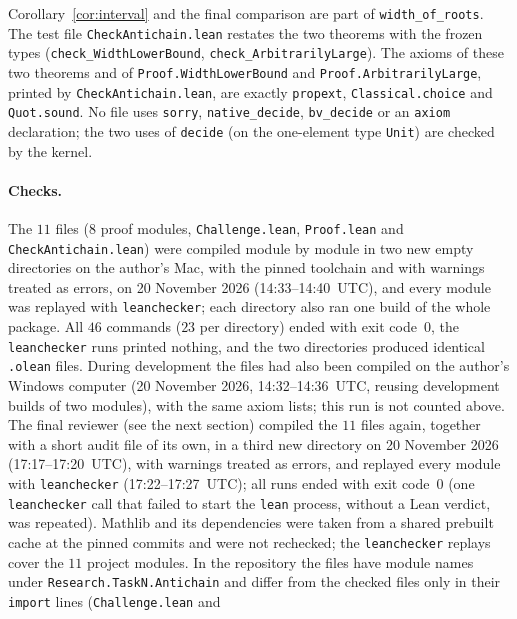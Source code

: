 \documentclass[11pt]{article}
\theoremstyle{definition}
\theoremstyle{remark}
\begin{document}
{\noindent Corollary~\ref{cor:interval} and the final comparison are part of
\texttt{width\_\allowbreak of\_\allowbreak roots}. The test file
\texttt{CheckAntichain.lean} restates the two theorems with the frozen types
(\texttt{check\_\allowbreak WidthLowerBound},
\texttt{check\_\allowbreak ArbitrarilyLarge}). The axioms of these two theorems
and of \texttt{Proof.WidthLowerBound} and \texttt{Proof.ArbitrarilyLarge},
printed by \texttt{CheckAntichain.lean}, are exactly \texttt{propext},
\texttt{Classical.choice} and \texttt{Quot.sound}. No file uses
\texttt{sorry}, \texttt{native\_\allowbreak decide},
\texttt{bv\_\allowbreak decide} or an \texttt{axiom} declaration; the two
uses of \texttt{decide} (on the one-element type \texttt{Unit}) are checked
by the kernel.

\paragraph{Checks.}
The $11$ files ($8$ proof modules, \texttt{Challenge.lean},
\texttt{Proof.lean} and \texttt{CheckAntichain.lean}) were compiled module by
module in two new empty directories on the author's Mac, with the pinned
toolchain and with warnings treated as errors, on 20 November 2026
(14:33--14:40~UTC), and every module was replayed with \texttt{leanchecker};
each directory also ran one build of the whole package. All $46$ commands
($23$ per directory) ended with exit code~$0$, the \texttt{leanchecker} runs
printed nothing, and the two directories produced identical \texttt{.olean}
files. During development the files had also been compiled on the author's
Windows computer (20 November 2026, 14:32--14:36~UTC, reusing development
builds of two modules), with the same axiom lists; this run is not counted
above. The final reviewer (see the next section) compiled the $11$ files again,
together with a short audit file of its own, in a third new directory on
20 November 2026 (17:17--17:20~UTC), with warnings treated as errors, and
replayed every module with \texttt{leanchecker} (17:22--17:27~UTC); all runs
ended with exit code~$0$ (one \texttt{leanchecker} call that failed to start
the \texttt{lean} process, without a Lean verdict, was repeated). Mathlib and
its dependencies were taken from a shared prebuilt cache at the pinned commits
and were not rechecked; the \texttt{leanchecker} replays cover the $11$ project
modules. In the repository the files have module names under
\texttt{Research.TaskN.Antichain} and differ from the checked files only in
their \texttt{import} lines (\texttt{Challenge.lean} and
}
\end{document}
